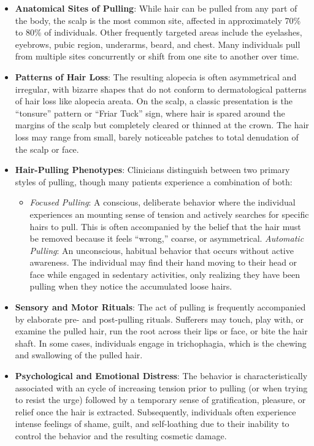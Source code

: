 \begin{itemize}
    \item \textbf{Anatomical Sites of Pulling}: While hair can be pulled from any part of the body, the scalp is the most common site, affected in approximately 70\% to 80\% of individuals. Other frequently targeted areas include the eyelashes, eyebrows, pubic region, underarms, beard, and chest. Many individuals pull from multiple sites concurrently or shift from one site to another over time.
    \item \textbf{Patterns of Hair Loss}: The resulting alopecia is often asymmetrical and irregular, with bizarre shapes that do not conform to dermatological patterns of hair loss like alopecia areata. On the scalp, a classic presentation is the ``tonsure'' pattern or ``Friar Tuck'' sign, where hair is spared around the margins of the scalp but completely cleared or thinned at the crown. The hair loss may range from small, barely noticeable patches to total denudation of the scalp or face.
    \item \textbf{Hair-Pulling Phenotypes}: Clinicians distinguish between two primary styles of pulling, though many patients experience a combination of both:
    \begin{itemize}
        \item \textit{Focused Pulling}: A conscious, deliberate behavior where the individual experiences an mounting sense of tension and actively searches for specific hairs to pull. This is often accompanied by the belief that the hair must be removed because it feels ``wrong,'' coarse, or asymmetrical.
        \textit{Automatic Pulling}: An unconscious, habitual behavior that occurs without active awareness. The individual may find their hand moving to their head or face while engaged in sedentary activities, only realizing they have been pulling when they notice the accumulated loose hairs.
    \end{itemize}
    \item \textbf{Sensory and Motor Rituals}: The act of pulling is frequently accompanied by elaborate pre- and post-pulling rituals. Sufferers may touch, play with, or examine the pulled hair, run the root across their lips or face, or bite the hair shaft. In some cases, individuals engage in trichophagia, which is the chewing and swallowing of the pulled hair.
    \item \textbf{Psychological and Emotional Distress}: The behavior is characteristically associated with an cycle of increasing tension prior to pulling (or when trying to resist the urge) followed by a temporary sense of gratification, pleasure, or relief once the hair is extracted. Subsequently, individuals often experience intense feelings of shame, guilt, and self-loathing due to their inability to control the behavior and the resulting cosmetic damage.

\end{itemize}
